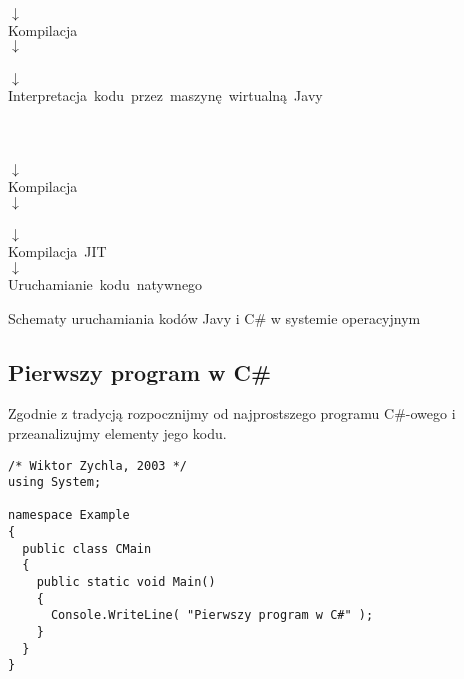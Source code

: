 \begin{table}[ht]
	\begin{center}

	  \\ $\downarrow$ \\
	 \mbox{Kompilacja}                                  \\ $\downarrow$ \\
	  \\ $\downarrow$ \\
	 \mbox{Interpretacja kodu przez maszynę wirtualną Javy} \\ 
         \mbox{}                                                         \\
         \mbox{}                                                         \\
	  \\ $\downarrow$ \\
	 \mbox{Kompilacja}                                  \\ $\downarrow$ \\
	  \\ $\downarrow$ \\
	 \mbox{Kompilacja JIT} \\ $\downarrow$ \\
	 \mbox{Uruchamianie kodu natywnego} 

	\end{center}
\caption{Schematy uruchamiania kodów Javy i C\# w systemie operacyjnym} 
\label{tab:RuntimeLangs}
\end{table}

\subsection{Pierwszy program w C\#}

Zgodnie z tradycją rozpocznijmy od najprostszego programu C\#-owego i przeanalizujmy elementy jego kodu.

\begin{scriptsize}
\begin{verbatim}
/* Wiktor Zychla, 2003 */
using System;

namespace Example
{
  public class CMain
  {
    public static void Main()
    {
      Console.WriteLine( "Pierwszy program w C#" );
    }
  }
}
\end{verbatim}
\end{scriptsize}

